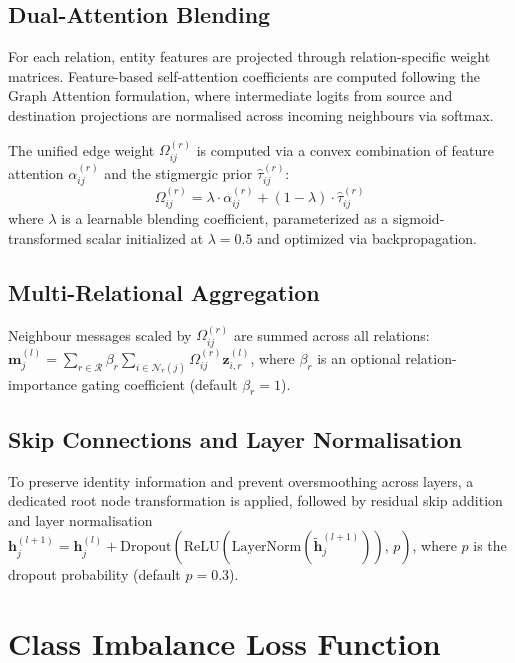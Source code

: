 \subsection{Dual-Attention Blending}
For each relation, entity features are projected through relation-specific weight matrices. Feature-based self-attention coefficients are computed following the Graph Attention formulation, where intermediate logits from source and destination projections are normalised across incoming neighbours via softmax.

The unified edge weight $\Omega_{ij}^{(r)}$ is computed via a convex combination of feature attention $\alpha_{ij}^{(r)}$ and the stigmergic prior $\hat{\tau}_{ij}^{(r)}$:
\begin{equation}
    \Omega_{ij}^{(r)} = \lambda \cdot \alpha_{ij}^{(r)} + (1 - \lambda) \cdot \hat{\tau}_{ij}^{(r)}
    \label{eq:dual_attention_blend}
\end{equation}
where $\lambda$ is a learnable blending coefficient, parameterized as a sigmoid-transformed scalar initialized at $\lambda = 0.5$ and optimized via backpropagation.

\subsection{Multi-Relational Aggregation}
Neighbour messages scaled by $\Omega_{ij}^{(r)}$ are summed across all relations: $\mathbf{m}_j^{(l)} = \sum_{r \in \mathcal{R}} \beta_r \sum_{i \in \mathcal{N}_r(j)} \Omega_{ij}^{(r)} \mathbf{z}_{i, r}^{(l)}$, where $\beta_r$ is an optional relation-importance gating coefficient (default $\beta_r = 1$).

\subsection{Skip Connections and Layer Normalisation}
To preserve identity information and prevent oversmoothing across layers, a dedicated root node transformation is applied, followed by residual skip addition and layer normalisation $\mathbf{h}_j^{(l+1)} = \mathbf{h}_j^{(l)} + \text{Dropout}\left(\text{ReLU}\left(\text{LayerNorm}\left(\tilde{\mathbf{h}}_j^{(l+1)}\right)\right), \, p\right)$, where $p$ is the dropout probability (default $p = 0.3$).

\section[Class Imbalance Loss Function]{Class Imbalance Loss Function}
\label{sec:focal_loss}
\label{sec:training_objective}

